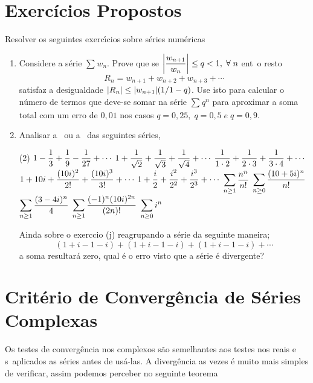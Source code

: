 \section*{Exercícios Propostos} 
Resolver os seguintes exerc\'{\i}cios sobre s\'{e}ries num\'{e}ricas
\begin{enumerate}[label=\rm{(\arabic*)},ref=\rm{(\arabic*)}]
\item Considere a s\'erie $\sum_{}w_{n}$.
Prove que se $\displaystyle{\left|\frac{w_{n+1}}{w_n} \right|\leq q<1},\;\forall\; n$  ent\ao\ o resto
\begin{equation*}
R_n=w_{n+1}+w_{n+2}+w_{n+3}+\cdots
\end{equation*}
satisfaz a desigualdade $\displaystyle{|R_n|\leq |w_{n+1}|({1}/{1-q})}$. Use isto para calcular o
n\'umero de termos que deve-se somar na s\'erie $\sum_{}q^{n}$ para aproximar a soma total com um erro de $0,01$ nos
casos $q=0,25,\;q=0,5\; e\; q=0,9$.

\item Analisar a \conv\ ou a  \dive\ das seguintes s\'{e}ries,
\begin{tasks}[label=(\alph*),item-indent=3em,label-width=4ex,ref=(\alph*)](2)
\task \(\displaystyle{1-\frac{1}{3}+\frac{1}{9}-\frac{1}{27}+\cdots}\)
\task \(\displaystyle{1+\frac{1}{\sqrt{2}}+\frac{1}{\sqrt{3}}+\frac{1}{\sqrt{4}}+\cdots}\)
\task \(\displaystyle{\frac{1}{1\cdot 2}+\frac{1}{2\cdot 3}+\frac{1}{3\cdot 4}+\cdots}\)
\task \(\displaystyle{1+10i+\frac{(10i)^2}{2!}+\frac{(10i)^3}{3!}+\cdots}\)
\task \(\displaystyle{1+\frac{i}{2}+\dfrac{i^2}{2^2}+\frac{i^3}{2^3}+\cdots}\)
\task \(\displaystyle{\sum_{n\geq 1}\dfrac{n^n}{n!}}\)
\task \(\displaystyle{\sum_{n\geq 0}\dfrac{(10+5i)^n}{n!}}\) 
\task \(\displaystyle{\sum_{n\geq 1}\dfrac{(3-4i)^n}{4}}\)
\task \(\displaystyle{\sum_{n\geq 1}\dfrac{(-1)^n(10i)^{2n}}{(2n)!}}\)
\task \(\displaystyle{\sum_{n\geq 0}i^{n}}\)
\end{tasks}

Ainda sobre o exerc\ii cio (j) reagrupando a s\'erie da seguinte maneira;
\begin{equation*}
(1+i-1-i)+(1+i-1-i)+(1+i-1-i)+\cdots
\end{equation*}
a soma resultar\'a zero, qual \'e o erro visto que a s\'erie \'e
divergente?
\end{enumerate}

\section{Critério de Converg\^encia de S\'eries Complexas}
Os testes de converg\^encia nos complexos s\~ao semelhantes aos
testes nos reais e s\ao\ aplicados as s\'eries antes de us\'{a}-las. A
diverg\^{e}ncia as vezes \'e muito mais simples de verificar, assim
podemos perceber no seguinte teorema

